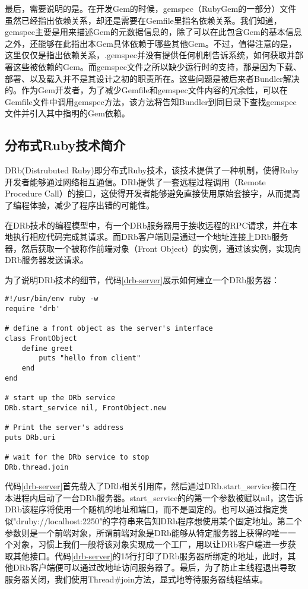 最后，需要说明的是。在开发Gem的时候，gemspec（RubyGem的一部分）文件虽然已经指出依赖关系，却还是需要在Gemfile里指名依赖关系。我们知道，gemspec主要是用来描述Gem的元数据信息的，除了可以在此包含Gem的基本信息之外，还能够在此指出本Gem具体依赖于哪些其他Gem。不过，值得注意的是，这里仅仅是指出依赖关系，.gemspec并没有提供任何机制告诉系统，如何获取并部署这些被依赖的Gem。而gemspec文件之所以缺少运行时的支持，那是因为下载、部署、以及载入并不是其设计之初的职责所在。这些问题是被后来者Bundler解决的。作为Gem开发者，为了减少Gemfile和gemspec文件内容的冗余性，可以在Gemfile文件中调用gemspec方法，该方法将告知Bundler到同目录下查找gemspec文件并引入其中指明的Gem依赖。
\subsection{分布式Ruby技术简介}
DRb(Distrubuted Ruby)即分布式Ruby技术，该技术提供了一种机制，使得Ruby开发者能够通过网络相互通信。DRb提供了一套远程过程调用（Remote Procedure Call）的接口，这使得开发者能够避免直接使用原始套接字，从而提高了编程体验，减少了程序出错的可能性。

在DRb技术的编程模型中，有一个DRb服务器用于接收远程的RPC请求，并在本地执行相应代码完成其请求。而DRb客户端则是通过一个地址连接上DRb服务器，然后获取一个被称作前端对象（Front Object）的实例，通过该实例，实现向DRb服务器发送请求。

为了说明DRb技术的细节，代码\ref{drb-server}展示如何建立一个DRb服务器：

\begin{lstlisting}[caption={DRb服务器实现代码}, label=drb-server]
#!/usr/bin/env ruby -w
require 'drb'

# define a front object as the server's interface
class FrontObject
	define greet
		puts "hello from client"
	end
end

# start up the DRb service
DRb.start_service nil, FrontObject.new

# Print the server's address
puts DRb.uri

# wait for the DRb service to stop
DRb.thread.join
\end{lstlisting}

代码\ref{drb-server}首先载入了DRb相关引用库，然后通过DRb.start\_service接口在本进程内启动了一台DRb服务器。start\_service的的第一个参数被赋以nil，这告诉DRb该程序将使用一个随机的地址和端口，而不是固定的。也可以通过指定类似"druby://localhost:2250"的字符串来告知DRb程序想使用某个固定地址。第二个参数则是一个前端对象，所谓前端对象是DRb能够从特定服务器上获得的唯一一个对象，习惯上我们一般将该对象实现成一个工厂，用以让DRb客户端进一步获取其他接口。代码\ref{drb-server}的15行打印了DRb服务器所绑定的地址，此时，其他DRb客户端便可以通过改地址访问服务器了。最后，为了防止主线程退出导致服务器关闭，我们使用Thread\#join方法，显式地等待服务器线程结束。

